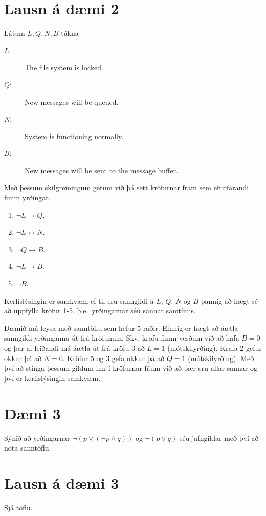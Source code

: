 \documentclass{article}
\begin{document}
\section*{Lausn á dæmi 2}
Látum $L, Q, N, B$ tákna
\begin{description}
    \item[$L$:] The file system is locked.
    \item[$Q$:] New messages will be queued.
    \item[$N$:] System is functioning normally.
    \item[$B$:] New messages will be sent to the message buffer.
\end{description}
Með þessum skilgreiningum getum við þá sett kröfurnar fram sem eftirfarandi fimm yrðingar.
\begin{enumerate}
    \item $\neg L\to Q$.
    \item $\neg L\leftrightarrow N$.
    \item $\neg Q\to B$.
    \item $\neg L \to B$.
    \item $\neg B$.
\end{enumerate}

Kerfislýsingin er samkvæm ef til eru sanngildi á $L$, $Q$, $N$ og $B$ þannig að hægt sé að uppfylla kröfur 1-5, þ.e.\ yrðingarnar séu sannar samtímis.

Dæmið má leysa með sanntöflu sem hefur 5 raðir. Einnig er hægt að áætla sanngildi yrðinganna út frá kröfunum. Skv. kröfu fimm verðum við að hafa $B=0$ og þar af leiðandi má áætla út frá kröfu 3 að $L=1$ (mótskilyrðing). Krafa 2 gefur okkur þá að $N=0$. Kröfur 5 og 3 gefa okkur þá að $Q=1$ (mótskilyrðing). Með því að stinga þessum gildum inn í kröfurnar fáum við að þær eru allar sannar og því er kerfislýsingin samkvæm.

\section*{Dæmi 3}
Sýnið að yrðingarnar $\neg(p \lor (\neg p\land q))$ og $\neg (p\lor q)$ séu jafngildar með því að nota sanntöflu.

\section*{Lausn á dæmi 3}
Sjá töflu.
\begin{table}[h]
\centering
{}
\caption{Sanntafla sem sýnir jafngildi yrðinganna $\neg(p \lor (\neg p\land q))$ og $\neg (p\lor q)$.}
\label{tab:d3}
\end{table}
\end{document}
